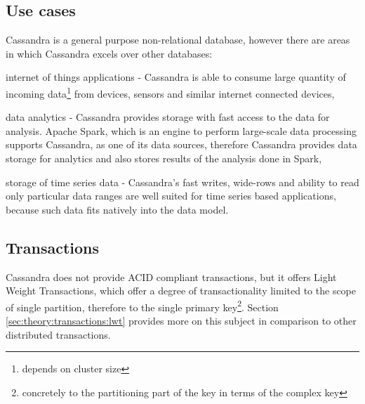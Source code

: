 \subsection{Use cases}
Cassandra is a general purpose non-relational database, however there are areas in which Cassandra excels over other databases:
\begin{enumerate*}
\item internet of things applications - Cassandra is able to consume large quantity of incoming data\footnote{depends on cluster size} from devices, sensors and similar internet connected devices,
\item data analytics - Cassandra provides storage with fast access to the data for analysis. Apache Spark, which is an engine to perform large-scale data processing \cite{ApacheSpark} supports Cassandra, as one of its data sources, therefore Cassandra provides data storage for analytics and also stores results of the analysis done in Spark,
\item storage of time series data - Cassandra's fast writes, wide-rows and ability to read only particular data ranges are well suited for time series based applications, because such data fits natively into the data model.
\end{enumerate*} 

\subsection{Transactions}
Cassandra does not provide ACID compliant transactions, but it offers Light Weight Transactions, which offer a degree of transactionality limited to the scope of single partition, therefore to the single primary key\footnote{concretely to the partitioning part of the key in terms of the complex key}. Section \ref{sec:theory:transactions:lwt} provides more on this subject in comparison to other distributed transactions. 

